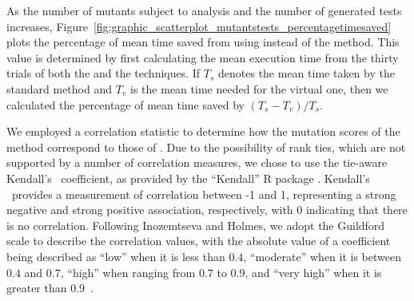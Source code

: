 
As the number of mutants subject to analysis and the number of generated tests increases, Figure~\ref{fig:graphic_scatterplot_mutantstests_percentagetimesaved} plots the percentage of mean time saved from using \vma instead of the \Original method.  This value is determined by first calculating the mean execution time from the thirty trials of both the \Standard and the \virtual techniques. If $T_s$ denotes the mean time taken by the standard method and $T_v$ is the mean time needed for the virtual one, then we calculated the percentage of mean time saved by $({T_s - T_v})/{T_s}$.


We employed a correlation statistic to determine how the mutation scores of the \tc method correspond to those of \vma.  Due to the possibility of rank ties, which are not supported by a number of correlation measures, we chose to use the tie-aware Kendall's \taub~coefficient, as provided by the ``Kendall'' R package \cite{KendallCran}.  Kendall's \taub~provides a measurement of correlation between -1 and 1, representing a strong negative and strong positive association, respectively, with 0 indicating that there is no correlation. Following Inozemtseva and Holmes, we adopt the Guildford scale to describe the correlation values, with the absolute value of a coefficient being described as ``low'' when it is less than $0.4$, ``moderate'' when it is between $0.4$ and $0.7$, ``high'' when ranging from $0.7$ to $0.9$, and ``very high'' when it is greater than \mbox{$0.9$ \cite{Inozemtseva2014}}.







